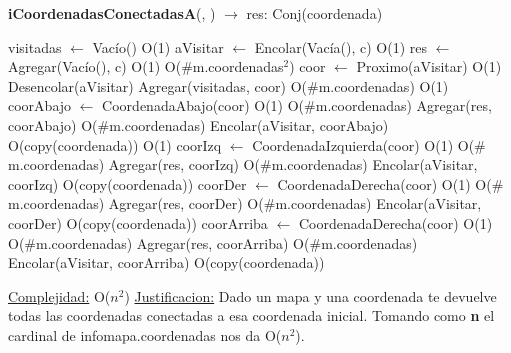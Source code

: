 \begin{Algoritmos}
\begin{algorithm}[H]{\textbf{iCoordenadasConectadasA}(, ) $\to$ res: Conj(coordenada)}
	\begin{algorithmic}[1]
		\State visitadas $\gets$ Vac\'io() \Comment O(1)
		\State aVisitar $\gets$ Encolar(Vac\'ia(), c) \Comment  O(1)
		\State res $\gets$ Agregar(Vac\'io(), c) \Comment O(1)
		 \Comment O($\#$m.coordenadas$^2$)
			\State coor $\gets$ Proximo(aVisitar) \Comment O(1)
			\State Desencolar(aVisitar)
			\State Agregar(visitadas, coor) \Comment O($\#$m.coordenadas)			
			 \Comment O(1)
					\State coorAbajo $\gets$ CoordenadaAbajo(coor) \Comment O(1)
					 \Comment O($\#$m.coordenadas)
						\State Agregar(res, coorAbajo) \Comment O($\#$m.coordenadas)
						\State Encolar(aVisitar, coorAbajo) \Comment O(copy(coordenada))
					\Else
					\EndIf
			\Else
			\EndIf
			 \Comment O(1)
					\State coorIzq $\gets$ CoordenadaIzquierda(coor) \Comment O(1)
					 \Comment O($\#$m.coordenadas)
						\State Agregar(res, coorIzq) \Comment O($\#$m.coordenadas)
						\State Encolar(aVisitar, coorIzq) \Comment O(copy(coordenada))
					\Else
					\EndIf
			\Else
			\EndIf
			\State coorDer $\gets$ CoordenadaDerecha(coor) \Comment O(1)
			 \Comment O($\#$m.coordenadas)
				\State Agregar(res, coorDer) \Comment O($\#$m.coordenadas)
				\State Encolar(aVisitar, coorDer) \Comment O(copy(coordenada))
			\Else
			\EndIf
			\State coorArriba $\gets$ CoordenadaDerecha(coor) \Comment O(1)
			 \Comment O($\#$m.coordenadas)
				\State Agregar(res, coorArriba) \Comment O($\#$m.coordenadas)
				\State Encolar(aVisitar, coorArriba) \Comment O(copy(coordenada))
			\Else
			\EndIf
		\EndWhile

		\medskip
		\Statex \underline{Complejidad:} O($n^2$)
			\Statex \underline{Justificacion:} Dado un mapa y una coordenada te devuelve todas las coordenadas conectadas a esa coordenada inicial. Tomando como \textbf{n} el cardinal de infomapa.coordenadas nos da O($n^2$).
	\end{algorithmic}
\end{algorithm}


\end{Algoritmos}
